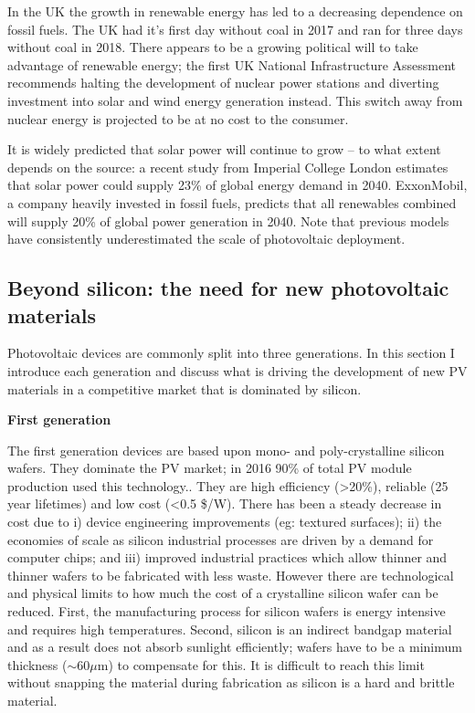 In the UK the growth in renewable energy has led to a decreasing dependence on fossil fuels. The UK had it's first day without coal in 2017\autocite{Brown2017} and ran for three days without coal in 2018.\autocite{Vaughan2018} There appears to be a growing political will to take advantage of renewable energy; the first UK National Infrastructure Assessment recommends halting the development of nuclear power stations and diverting investment into solar and wind energy generation instead.\autocite{NIA2018} This switch away from nuclear energy is projected to be at no cost to the consumer.

It is widely predicted that solar power will continue to grow -- to what extent depends on the source: a recent study from Imperial College London estimates that solar power could supply 23\% of global energy demand in 2040.\autocite{Grantham2017} ExxonMobil, a company heavily invested in fossil fuels, predicts that all renewables combined will supply 20\% of global power generation in 2040.\autocite{exxon2018} Note that previous models have consistently underestimated the scale of photovoltaic deployment.\autocite{Creutzig2017}

\subsection{Beyond silicon: the need for new photovoltaic materials}

Photovoltaic devices are commonly split into three generations. In this section I introduce each generation and discuss what is driving the development of new PV materials in a competitive market that is dominated by silicon.

\textbf{First generation}

The first generation devices are based upon mono- and poly-crystalline silicon wafers. They dominate the PV market; in 2016 90\% of total PV module production used this technology.\autocite{Jager-Waldau2017}. They are high efficiency (>20\%), reliable (25 year lifetimes) and low cost (<0.5 \$/W). There has been a steady decrease in cost due to i) device engineering improvements (eg: textured surfaces); ii) the economies of scale as silicon industrial processes are driven by a demand for computer chips; and iii) improved industrial practices which allow thinner and thinner wafers to be fabricated with less waste. However there are technological and physical limits to how much the cost of a crystalline silicon wafer can be reduced. First, the manufacturing process for silicon wafers is energy intensive and requires high temperatures. Second, silicon is an indirect bandgap material and as a result does not absorb sunlight efficiently; wafers have to be a minimum thickness ($\sim 60\mu \textrm{m}$) to compensate for this. It is difficult to reach this limit without snapping the material during fabrication as silicon is a hard and brittle material.

